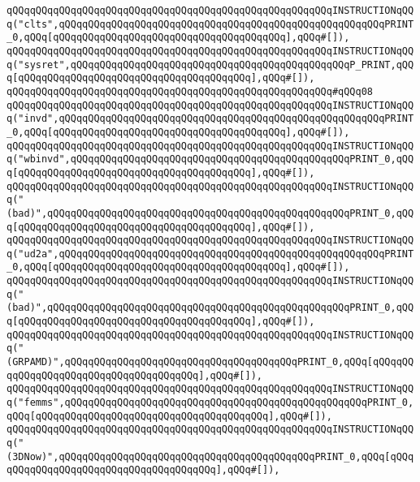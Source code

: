 \verb|qQQqqQQqqQQqqQQqqQQqqQQqqQQqqQQqqQQqqQQqqQQqqQQqqQQqqQQqINSTRUCTIONqQQq("clts",qQQqqQQqqQQqqQQqqQQqqQQqqQQqqQQqqQQqqQQqqQQqqQQqqQQqqQQqPRINT_0,qQQq[qQQqqQQqqQQqqQQqqQQqqQQqqQQqqQQqqQQqqQQq],qQQq#[]),|\newline
\verb|qQQqqQQqqQQqqQQqqQQqqQQqqQQqqQQqqQQqqQQqqQQqqQQqqQQqqQQqINSTRUCTIONqQQq("sysret",qQQqqQQqqQQqqQQqqQQqqQQqqQQqqQQqqQQqqQQqqQQqqQQqP_PRINT,qQQq[qQQqqQQqqQQqqQQqqQQqqQQqqQQqqQQqqQQqqQQq],qQQq#[]),|\newline
\verb|qQQqqQQqqQQqqQQqqQQqqQQqqQQqqQQqqQQqqQQqqQQqqQQqqQQqqQQq#qQQq08|\newline
\verb|qQQqqQQqqQQqqQQqqQQqqQQqqQQqqQQqqQQqqQQqqQQqqQQqqQQqqQQqINSTRUCTIONqQQq("invd",qQQqqQQqqQQqqQQqqQQqqQQqqQQqqQQqqQQqqQQqqQQqqQQqqQQqqQQqPRINT_0,qQQq[qQQqqQQqqQQqqQQqqQQqqQQqqQQqqQQqqQQqqQQq],qQQq#[]),|\newline
\verb|qQQqqQQqqQQqqQQqqQQqqQQqqQQqqQQqqQQqqQQqqQQqqQQqqQQqqQQqINSTRUCTIONqQQq("wbinvd",qQQqqQQqqQQqqQQqqQQqqQQqqQQqqQQqqQQqqQQqqQQqqQQqPRINT_0,qQQq[qQQqqQQqqQQqqQQqqQQqqQQqqQQqqQQqqQQqqQQq],qQQq#[]),|\newline
\verb|qQQqqQQqqQQqqQQqqQQqqQQqqQQqqQQqqQQqqQQqqQQqqQQqqQQqqQQqINSTRUCTIONqQQq("(bad)",qQQqqQQqqQQqqQQqqQQqqQQqqQQqqQQqqQQqqQQqqQQqqQQqqQQqPRINT_0,qQQq[qQQqqQQqqQQqqQQqqQQqqQQqqQQqqQQqqQQqqQQq],qQQq#[]),|\newline
\verb|qQQqqQQqqQQqqQQqqQQqqQQqqQQqqQQqqQQqqQQqqQQqqQQqqQQqqQQqINSTRUCTIONqQQq("ud2a",qQQqqQQqqQQqqQQqqQQqqQQqqQQqqQQqqQQqqQQqqQQqqQQqqQQqqQQqPRINT_0,qQQq[qQQqqQQqqQQqqQQqqQQqqQQqqQQqqQQqqQQqqQQq],qQQq#[]),|\newline
\verb|qQQqqQQqqQQqqQQqqQQqqQQqqQQqqQQqqQQqqQQqqQQqqQQqqQQqqQQqINSTRUCTIONqQQq("(bad)",qQQqqQQqqQQqqQQqqQQqqQQqqQQqqQQqqQQqqQQqqQQqqQQqqQQqPRINT_0,qQQq[qQQqqQQqqQQqqQQqqQQqqQQqqQQqqQQqqQQqqQQq],qQQq#[]),|\newline
\verb|qQQqqQQqqQQqqQQqqQQqqQQqqQQqqQQqqQQqqQQqqQQqqQQqqQQqqQQqINSTRUCTIONqQQq("(GRPAMD)",qQQqqQQqqQQqqQQqqQQqqQQqqQQqqQQqqQQqqQQqPRINT_0,qQQq[qQQqqQQqqQQqqQQqqQQqqQQqqQQqqQQqqQQqqQQq],qQQq#[]),|\newline
\verb|qQQqqQQqqQQqqQQqqQQqqQQqqQQqqQQqqQQqqQQqqQQqqQQqqQQqqQQqINSTRUCTIONqQQq("femms",qQQqqQQqqQQqqQQqqQQqqQQqqQQqqQQqqQQqqQQqqQQqqQQqqQQqPRINT_0,qQQq[qQQqqQQqqQQqqQQqqQQqqQQqqQQqqQQqqQQqqQQq],qQQq#[]),|\newline
\verb|qQQqqQQqqQQqqQQqqQQqqQQqqQQqqQQqqQQqqQQqqQQqqQQqqQQqqQQqINSTRUCTIONqQQq("(3DNow)",qQQqqQQqqQQqqQQqqQQqqQQqqQQqqQQqqQQqqQQqqQQqPRINT_0,qQQq[qQQqqQQqqQQqqQQqqQQqqQQqqQQqqQQqqQQqqQQq],qQQq#[]),|\newline
